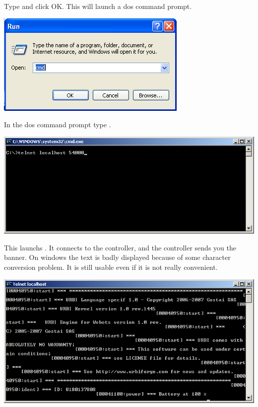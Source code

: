 Type  and click OK. This will launch a dos command prompt.

\begin{center}
  \includegraphics{img/webots/run-cmd-windows}
\end{center}

In the dos command prompt type .

\begin{center}
  \includegraphics[width=.8\linewidth]{img/webots/telnet-windows}
\end{center}

This launchs . It connects to the \urbi controller,
and the \urbi controller sends you the \urbi banner. On windows the
text is badly displayed because of some character conversion
problem. It is still usable even if it is not really convenient.

\begin{center}
  \includegraphics[width=.8\linewidth]{img/webots/telnet-urbi-windows}
\end{center}

